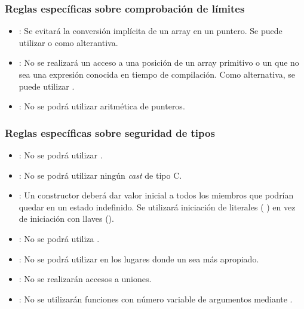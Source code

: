 \subsubsection{Reglas específicas sobre comprobación de límites}

\begin{itemize}

\item {}:
Se evitará la conversión implícita de un array en un puntero.
Se puede utilizar  o 
como alterantiva.

\item {}:
No se realizará un acceso a una posición de un array primitivo
o un  que no sea una expresión conocida en
tiempo de compilación. Como alternativa, se puede utilizar
.

\item {}:
No se podrá utilizar aritmética de punteros.

\end{itemize}

\subsubsection{Reglas específicas sobre seguridad de tipos}

\begin{itemize}

\item {}:
No se podrá utilizar .

\item {}:
No se podrá utilizar ningún \emph{cast} de tipo C.

\item {}:
Un constructor deberá dar valor inicial a todos los miembros que podrían
quedar en un estado indefinido.
Se utilizará iniciación de literales ( )
en vez de iniciación con llaves ().

\item {}:
No se podrá utiliza .

\item {}:
No se podrá utilizar  en los lugares
donde un  sea más apropiado.

\item {}:
No se realizarán accesos a uniones.

\item {}:
No se utilizarán funciones con número variable de argumentos mediante
.

\end{itemize}
